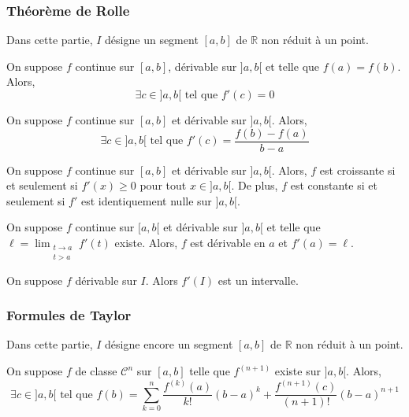   \subsubsection{Théorème de Rolle}

  Dans cette partie, $I$ désigne un segment $[a,b]$ de $\mathbb{R}$ non réduit à un point.

  \begin{theorem}
    On suppose $f$ continue sur $[a,b]$, dérivable sur $]a,b[$ et telle que $f(a) = f(b)$. Alors,
    \[ \exists c \in ]a,b[ \text{ tel que } f'(c) = 0 \]
  \end{theorem}

  \begin{theorem}
    On suppose $f$ continue sur $[a,b]$ et dérivable sur $]a,b[$. Alors,
    \[ \exists c \in ]a,b[ \text{ tel que } f'(c) = \frac{f(b) - f(a)}{b-a} \]
  \end{theorem}

  \begin{corollary}
    On suppose $f$ continue sur $[a,b]$ et dérivable sur $]a,b[$. Alors, $f$ est croissante si et seulement si $f'(x) \geq 0$ pour tout $x \in ]a,b[$. De plus, $f$ est constante si et seulement si $f'$ est identiquement nulle sur $]a,b[$.
  \end{corollary}

  \begin{corollary}
    On suppose $f$ continue sur $[a,b[$ et dérivable sur $]a,b[$ et telle que $\ell = \lim_{\substack{t \rightarrow a \\ t > a}} f'(t)$ existe. Alors, $f$ est dérivable en $a$ et $f'(a) = \ell$.
  \end{corollary}


  \begin{theorem}
    On suppose $f$ dérivable sur $I$. Alors $f'(I)$ est un intervalle.
  \end{theorem}

  \subsubsection{Formules de Taylor}


  Dans cette partie, $I$ désigne encore un segment $[a,b]$ de $\mathbb{R}$ non réduit à un point.

  \begin{theorem}
    On suppose $f$ de classe $\mathcal{C}^n$ sur $[a,b]$ telle que $f^{(n+1)}$ existe sur $]a,b[$. Alors,
    \[ \exists c \in ]a,b[ \text{ tel que } f(b) = \sum_{k=0}^{n} \frac{f^{(k)} (a)}{k!} (b-a)^k + \frac{f^{(n+1)}(c)}{(n+1)!} (b-a)^{n+1} \]
  \end{theorem}

